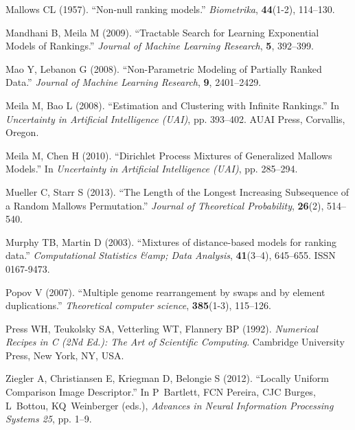 \documentclass[article,nojss]{jss}
\begin{document}
\begin{thebibliography}{36}
Mallows CL (1957).
\newblock \enquote{{Non-null ranking models}.}
\newblock \emph{Biometrika}, \textbf{44}(1-2), 114--130.

Mandhani B, Meila M (2009).
\newblock \enquote{{Tractable Search for Learning Exponential Models of
  Rankings}.}
\newblock \emph{Journal of Machine Learning Research}, \textbf{5}, 392--399.

Mao Y, Lebanon G (2008).
\newblock \enquote{{Non-Parametric Modeling of Partially Ranked Data}.}
\newblock \emph{Journal of Machine Learning Research}, \textbf{9}, 2401--2429.

Meila M, Bao L (2008).
\newblock \enquote{{Estimation and Clustering with Infinite Rankings}.}
\newblock In \emph{Uncertainty in Artificial Intelligence (UAI)}, pp. 393--402.
  AUAI Press, Corvallis, Oregon.

Meila M, Chen H (2010).
\newblock \enquote{{Dirichlet Process Mixtures of Generalized Mallows Models}.}
\newblock In \emph{Uncertainty in Artificial Intelligence (UAI)}, pp. 285--294.

Mueller C, Starr S (2013).
\newblock \enquote{{The Length of the Longest Increasing Subsequence of a
  Random Mallows Permutation}.}
\newblock \emph{Journal of Theoretical Probability}, \textbf{26}(2), 514--540.

Murphy TB, Martin D (2003).
\newblock \enquote{{Mixtures of distance-based models for ranking data}.}
\newblock \emph{Computational Statistics \&amp; Data Analysis},
  \textbf{41}(3–4), 645--655.
\newblock ISSN 0167-9473.

Popov V (2007).
\newblock \enquote{{Multiple genome rearrangement by swaps and by element
  duplications}.}
\newblock \emph{Theoretical computer science}, \textbf{385}(1-3), 115--126.

Press WH, Teukolsky SA, Vetterling WT, Flannery BP (1992).
\newblock \emph{{Numerical Recipes in C (2Nd Ed.): The Art of Scientific
  Computing}}.
\newblock Cambridge University Press, New York, NY, USA.

Ziegler A, Christiansen E, Kriegman D, Belongie S (2012).
\newblock \enquote{{Locally Uniform Comparison Image Descriptor}.}
\newblock In P~Bartlett, FCN Pereira, CJC Burges, L~Bottou, KQ~Weinberger
  (eds.), \emph{Advances in Neural Information Processing Systems 25}, pp.
  1--9.

\end{thebibliography}
\end{document}
